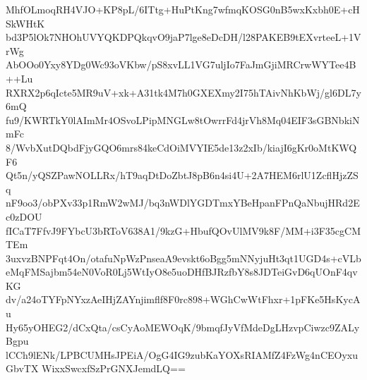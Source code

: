 MhfOLmoqRH4VJO+KP8pL/6ITtg+HuPtKng7wfmqKOSG0nB5wxKxbh0E+cHSkWHtK
bd3P5lOk7NHOhUVYQKDPQkqvO9jaP7lge8eDcDH/l28PAKEB9tEXvrteeL+1VrWg
AbOOo0Yxy8YDg0Wc93oVKbw/pS8xvLL1VG7uljIo7FaJmGjiMRCrwWYTee4B++Lu
RXRX2p6qIcte5MR9uV+xk+A31tk4M7h0GXEXmy2I75hTAivNhKbWj/gl6DL7y6mQ
fu9/KWRTkY0lAImMr4OSvoLPipMNGLw8tOwrrFd4jrVh8Mq04EIF3sGBNbkiNmFc
8/WvbXutDQbdFjyGQO6mrs84keCdOiMVYIE5de13z2xIb/kiajI6gKr0oMtKWQF6
Qt5n/yQSZPawNOLLRx/hT9aqDtDoZbtJ8pB6n4si4U+2A7HEM6rlU1ZcflHjzZSq
nF9oo3/obPXv33p1RmW2wMJ/bq3nWDlYGDTmxYBeHpanFPnQaNbujHRd2Ec0zDOU
fICaT7FfvJ9FYbcU3bRToV638A1/9kzG+HbufQOvUlMV9k8F/MM+i3F35cgCMTEm
3uxvzBNPFqt4On/otafuNpWzPnseaA9evskt6oBgg5mNNyjuHt3qt1UGD4s+cVLb
eMqFMSajbm54eN0VoR0Lj5WtIyO8e5uoDHfBJRzfbY8s8JDTeiGvD6qUOnF4qvKG
dv/a24oTYFpNYxzAeIHjZAYnjimflf8F0rc898+WGhCwWtFhxr+1pFKe5HsKycAu
Hy65yOHEG2/dCxQta/csCyAoMEWOqK/9bmqfJyVfMdeDgLHzvpCiwzc9ZALyBgpu
lCCh9lENk/LPBCUMHsJPEiA/OgG4IG9zubKaYOXsRIAMfZ4FzWg4nCEOyxuGbvTX
WixxSwcxfSzPrGNXJemdLQ==
